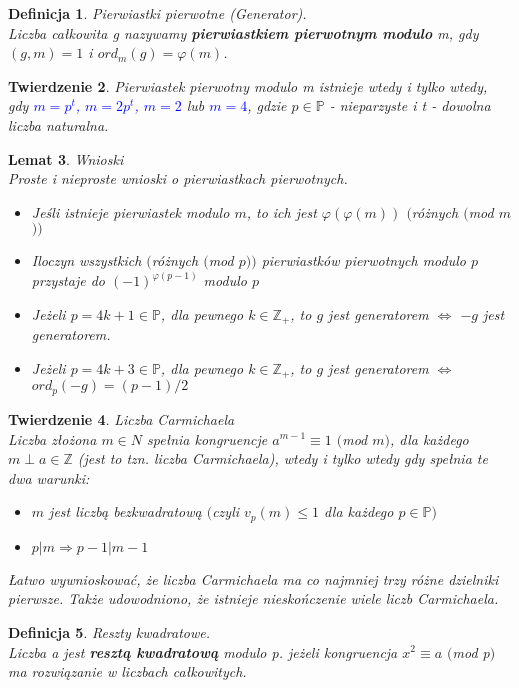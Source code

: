 \documentclass[10pt,a4paper]{article}
\newtheorem{theorem}{Twierdzenie}[section]
\newtheorem{lemma}[theorem]{Lemat}
\newtheorem{defi}[theorem]{Definicja}
\newcommand{\Z}{\mathbb{Z}}
\newcommand{\p}{\mathbb{P}}
\begin{document}
\begin{defi}{Pierwiastki pierwotne (Generator).}
\color{black}
\\ Liczba całkowita g nazywamy \textbf{pierwiastkiem pierwotnym modulo} m, gdy $(g,m)=1$ i $ord_m(g)=\varphi(m)$.
\end{defi}
\begin{theorem}
\color{black}
Pierwiastek pierwotny modulo m istnieje wtedy i tylko wtedy, gdy \textcolor{blue}{$m=p^t$, $m=2p^t$, $m=2$} lub \textcolor{blue}{$m=4$}, gdzie $p \in \p$ - nieparzyste i t - dowolna liczba naturalna.
\end{theorem}
\begin{lemma}{Wnioski}
\\
\color{black}
	Proste i nieproste wnioski o pierwiastkach pierwotnych.
	\begin{itemize}
		\item
		Jeśli istnieje pierwiastek modulo $m$, to ich jest $\varphi(\varphi(m))$ $($różnych $($mod $m$$))$
		\item
		Iloczyn wszystkich $($różnych $($mod $p))$ pierwiastków pierwotnych modulo $p$ przystaje do $(-1)^{\varphi(p-1)}$ modulo $p$ 
		\item
		Jeżeli $p=4k+1 \in \p$, dla pewnego $k \in \Z_{+}$, to $g$ jest generatorem $\Leftrightarrow$ $-g$ jest generatorem.
		\item
		Jeżeli $p=4k+3 \in \p$, dla pewnego $k \in \Z_{+}$, to $g$ jest generatorem $\Leftrightarrow$ $ord_p(-g)=(p-1)/2$
	\end{itemize}
\end{lemma}
\begin{theorem}{Liczba Carmichaela}
	\\
	\color{black}
	Liczba złożona $m \in N$ spełnia kongruencje $a^{m-1} \equiv 1$ $($mod $m)$, dla każdego $m \perp a \in \Z$ (jest to tzn. liczba Carmichaela), wtedy i tylko wtedy gdy spełnia te dwa warunki:
	\begin{itemize}
		\item 
		$m$ jest liczbą bezkwadratową $($czyli $v_p(m) \leq 1$ dla każdego $p \in \p$$)$
		\item
		$p|m \Rightarrow p-1|m-1$ 
	\end{itemize}
	Łatwo wywnioskować, że liczba Carmichaela ma co najmniej trzy różne dzielniki pierwsze. Także udowodniono, że istnieje nieskończenie wiele liczb Carmichaela.
\end{theorem}
\begin{defi}{Reszty kwadratowe.}
\color{black}
\\ Liczba a jest \textbf{resztą kwadratową} modulo p. jeżeli kongruencja $x^2 \equiv a$ $($mod p$)$ ma rozwiązanie w liczbach całkowitych.
\end{defi}
\end{document}
